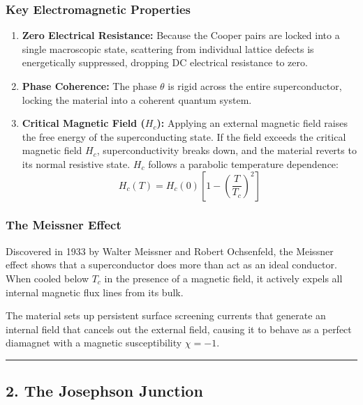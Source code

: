 \documentclass[
]{article}
\providecommand{\tightlist}{%
  \setlength{\itemsep}{0pt}\setlength{\parskip}{0pt}}
\begin{document}
\subsubsection{Key Electromagnetic
Properties}\label{key-electromagnetic-properties}

\begin{enumerate}
\def\labelenumi{\arabic{enumi}.}
\tightlist
\item
  \textbf{Zero Electrical Resistance:} Because the Cooper pairs are
  locked into a single macroscopic state, scattering from individual
  lattice defects is energetically suppressed, dropping DC electrical
  resistance to zero.
\item
  \textbf{Phase Coherence:} The phase \(\theta\) is rigid across the
  entire superconductor, locking the material into a coherent quantum
  system.
\item
  \textbf{Critical Magnetic Field (\(H_c\)):} Applying an external
  magnetic field raises the free energy of the superconducting state. If
  the field exceeds the critical magnetic field \(H_c\),
  superconductivity breaks down, and the material reverts to its normal
  resistive state. \(H_c\) follows a parabolic temperature dependence:
  \[H_c(T) = H_c(0) \left[1 - \left(\frac{T}{T_c}\right)^2\right]\]
\end{enumerate}

\subsubsection{The Meissner Effect}\label{the-meissner-effect}

Discovered in 1933 by Walter Meissner and Robert Ochsenfeld, the
Meissner effect shows that a superconductor does more than act as an
ideal conductor. When cooled below \(T_c\) in the presence of a magnetic
field, it actively expels all internal magnetic flux lines from its
bulk.

The material sets up persistent surface screening currents that generate
an internal field that cancels out the external field, causing it to
behave as a perfect diamagnet with a magnetic susceptibility
\(\chi = -1\).

\begin{center}\rule{0.5\linewidth}{0.5pt}\end{center}

\subsection{2. The Josephson Junction}\label{the-josephson-junction}
\end{document}
